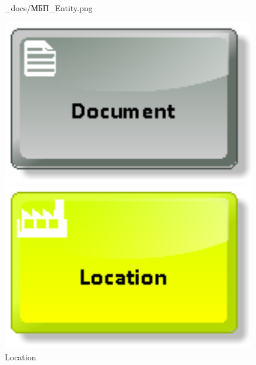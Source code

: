 \begin{figure}[!h]
\begin{minipage}{0.15\textwidth}
            {_docs/МБП_Entity.png}
        \caption{Entity}
        \label{fig:MBP_Entity}
    \end{minipage}
    \begin{minipage}{0.15\textwidth}
        \centering
        \includegraphics[width=0.99\textwidth]
            {_docs/МБП_Document.png}
        \caption{Document}
        \label{fig:MBP_Document}
    \end{minipage}
    \begin{minipage}{0.15\textwidth}
        \centering
        \includegraphics[width=0.99\textwidth]
            {_docs/МБП_Location.png}
        \caption{Location}
        \label{fig:MBP_Location}
    \end{minipage}
    \begin{minipage}{0.15\textwidth}
        \centering

\end{minipage}
\end{figure}
